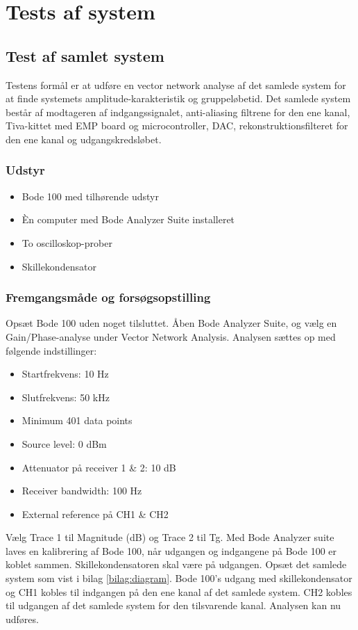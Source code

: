 \chapter{Tests af system}
\label{bilag:test}
\section{Test af samlet system}
\label{sec:test_samlet}
Testens formål er at udføre en vector network analyse af det samlede system for at finde systemets amplitude-karakteristik og gruppeløbetid. 
Det samlede system består af modtageren af indgangssignalet, anti-aliasing filtrene for den ene kanal, Tiva-kittet med EMP board og microcontroller, DAC, rekonstruktionsfilteret for den ene kanal og udgangskredsløbet. 

\subsection{Udstyr}
\begin{itemize}
	\item Bode 100 med tilhørende udstyr
	\item Èn computer med Bode Analyzer Suite installeret
	\item To oscilloskop-prober
	\item Skillekondensator
\end{itemize}

\subsection{Fremgangsmåde og forsøgsopstilling}
Opsæt Bode 100 uden noget tilsluttet. 
Åben Bode Analyzer Suite, og vælg en Gain/Phase-analyse under Vector Network Analysis. 
Analysen sættes op med følgende indstillinger:
\begin{multicols}{2}
\begin{itemize}
	\item Startfrekvens: 10 Hz
	\item Slutfrekvens: 50 kHz
	\item Minimum 401 data points
	\item Source level: 0 dBm
	\item Attenuator på receiver 1 \& 2: 10 dB
	\item Receiver bandwidth: 100 Hz
	\item External reference på CH1 \& CH2
\end{itemize}
\end{multicols}
Vælg Trace 1 til Magnitude (dB) og Trace 2 til Tg. \newline
Med Bode Analyzer suite laves en kalibrering af Bode 100, når udgangen og indgangene på Bode 100 er koblet sammen. 
Skillekondensatoren skal være på udgangen. \newline
Opsæt det samlede system som vist i bilag \ref{bilag:diagram}. 
Bode 100's udgang med skillekondensator og CH1 kobles til indgangen på den ene kanal af det samlede system. 
CH2 kobles til udgangen af det samlede system for den tilsvarende kanal. 
Analysen kan nu udføres. 

